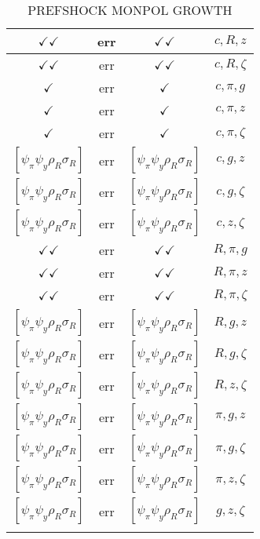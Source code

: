 \documentclass[a4paper,10pt]{article}
\begin{document}
\begin{longtable}{|c|c|c|c|}
\hline
$\checkmark\checkmark$ & err & $\checkmark\checkmark$ & ${c},{R},{z}$ \\
\hline
$\checkmark\checkmark$ & err & $\checkmark\checkmark$ & ${c},{R},{\zeta}$ \\
\hline
$\checkmark$ & err & $\checkmark$ & ${c},{\pi},{g}$ \\
\hline
$\checkmark$ & err & $\checkmark$ & ${c},{\pi},{z}$ \\
\hline
$\checkmark$ & err & $\checkmark$ & ${c},{\pi},{\zeta}$ \\
\hline
$[\psi_\pi \psi_y \rho_R \sigma_R ]$ & err & $[\psi_\pi \psi_y \rho_R \sigma_R ]$ & ${c},{g},{z}$ \\
\hline
$[\psi_\pi \psi_y \rho_R \sigma_R ]$ & err & $[\psi_\pi \psi_y \rho_R \sigma_R ]$ & ${c},{g},{\zeta}$ \\
\hline
$[\psi_\pi \psi_y \rho_R \sigma_R ]$ & err & $[\psi_\pi \psi_y \rho_R \sigma_R ]$ & ${c},{z},{\zeta}$ \\
\hline
$\checkmark\checkmark$ & err & $\checkmark\checkmark$ & ${R},{\pi},{g}$ \\
\hline
$\checkmark\checkmark$ & err & $\checkmark\checkmark$ & ${R},{\pi},{z}$ \\
\hline
$\checkmark\checkmark$ & err & $\checkmark\checkmark$ & ${R},{\pi},{\zeta}$ \\
\hline
$[\psi_\pi \psi_y \rho_R \sigma_R ]$ & err & $[\psi_\pi \psi_y \rho_R \sigma_R ]$ & ${R},{g},{z}$ \\
\hline
$[\psi_\pi \psi_y \rho_R \sigma_R ]$ & err & $[\psi_\pi \psi_y \rho_R \sigma_R ]$ & ${R},{g},{\zeta}$ \\
\hline
$[\psi_\pi \psi_y \rho_R \sigma_R ]$ & err & $[\psi_\pi \psi_y \rho_R \sigma_R ]$ & ${R},{z},{\zeta}$ \\
\hline
$[\psi_\pi \psi_y \rho_R \sigma_R ]$ & err & $[\psi_\pi \psi_y \rho_R \sigma_R ]$ & ${\pi},{g},{z}$ \\
\hline
$[\psi_\pi \psi_y \rho_R \sigma_R ]$ & err & $[\psi_\pi \psi_y \rho_R \sigma_R ]$ & ${\pi},{g},{\zeta}$ \\
\hline
$[\psi_\pi \psi_y \rho_R \sigma_R ]$ & err & $[\psi_\pi \psi_y \rho_R \sigma_R ]$ & ${\pi},{z},{\zeta}$ \\
\hline
$[\psi_\pi \psi_y \rho_R \sigma_R ]$ & err & $[\psi_\pi \psi_y \rho_R \sigma_R ]$ & ${g},{z},{\zeta}$ \\
\hline
\caption{PREFSHOCK MONPOL GROWTH}
\label{table:MyTableLabel}
\end{longtable}
\end{document}
